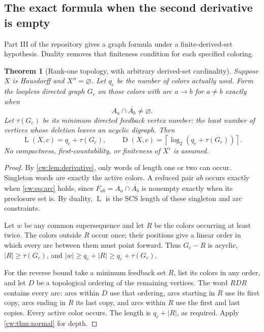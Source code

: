 \documentclass[11pt,letterpaper]{article}
\numberwithin{equation}{section}
\newtheorem{theorem}{Theorem}[section]
\theoremstyle{definition}
\theoremstyle{remark}
\theoremstyle{definition}
\newcommand{\ceil}[1]{\left\lceil#1\right\rceil}
\newcommand{\depth}{\operatorname{D}}
\newcommand{\layers}{\operatorname{L}}
\newcommand{\len}[1]{\lvert #1\rvert}
\newcommand{\cwcl}[1]{\overline{#1}}
\begin{document}
\subsection{The exact formula when the second derivative is empty}

Part III of the repository gives a graph formula under a finite-derived-set
hypothesis. Duality removes that finiteness condition for each specified
coloring.

\begin{theorem}[Rank-one topology, with arbitrary derived-set cardinality]
\label{cw:thm:rankone}
Suppose $X$ is Hausdorff and $X''=\varnothing$. Let $q_c$ be the number of
colors actually used. Form the loopless directed graph $G_c$ on those colors
with arc $a\to b$ for $a\ne b$ exactly when
\begin{equation}\label{cw:eq:arc}
 A_a\cap\cwcl{A_b}\ne\varnothing.
\end{equation}
Let $\tau(G_c)$ be its minimum directed feedback vertex number: the least
number of vertices whose deletion leaves an acyclic digraph. Then
\begin{equation}\label{cw:eq:graphformula}
 \layers(X,c)=q_c+\tau(G_c),\qquad
 \depth(X,c)=\ceil{\log_2(q_c+\tau(G_c))}.
\end{equation}
No compactness, first-countability, or finiteness of $X'$ is assumed.
\end{theorem}
\begin{proof}
By \cref{cw:lem:derivative}, only words of length one or two can occur.
Singleton words are exactly the active colors. A reduced pair $ab$ occurs
exactly when \eqref{cw:eq:arc} holds, since
$F_{ab}=\cwcl{A_a\cap\cwcl{A_b}}$ is nonempty exactly when its preclosure set is.
By duality, $\layers$ is the SCS length of these singleton and arc constraints.

Let $w$ be any common supersequence and let $R$ be the colors occurring at
least twice. The colors outside $R$ occur once; their positions give a linear
order in which every arc between them must point forward. Thus $G_c-R$ is
acyclic, $|R|\ge\tau(G_c)$, and
$\len w\ge q_c+|R|\ge q_c+\tau(G_c)$.

For the reverse bound take a minimum feedback set $R$, list its colors in
any order, and let $D$ be a topological ordering of the remaining vertices.
The word $RDR$ contains every arc: arcs within $D$ use that ordering, arcs
starting in $R$ use its first copy, arcs ending in $R$ its last copy, and
arcs within $R$ use the first and last copies. Every active color occurs.
The length is $q_c+|R|$, as required. Apply \cref{cw:thm:normal} for depth.
\end{proof}
\end{document}
